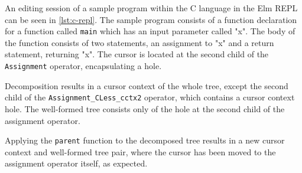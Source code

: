 An editing session of a sample program within the C language in the Elm
REPL can be seen in \cref{lst:c-repl}. The sample program consists of a function
declaration for a function called \texttt{main} which has an input
parameter called "x". The body of the function consists of two statements,
an assignment to "x" and a return statement, returning "x".
The cursor is located at the second child of the \texttt{Assignment} operator, encapsulating a hole.

Decomposition results in a cursor context of the whole tree, except
the second child of the \texttt{Assignment\_CLess\_cctx2} operator, which
contains a cursor context hole. The well-formed tree consists only
of the hole at the second child of the assignment operator.

Applying the \texttt{parent} function to the decomposed tree results in a
new cursor context and well-formed tree pair, where the cursor has been moved
to the assignment operator itself, as expected.

